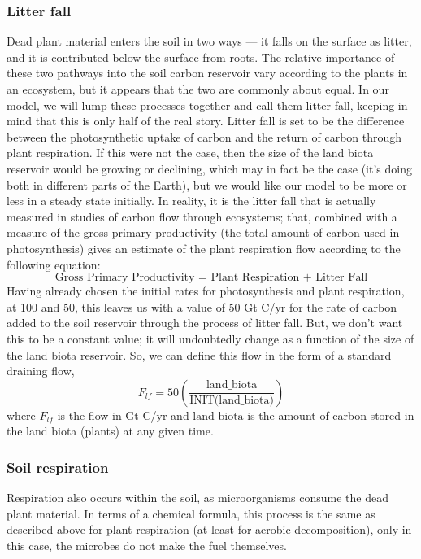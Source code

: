 \documentclass[11pt,letterpaper]{article}
\begin{document}
\subsubsection*{Litter fall}
Dead plant material enters the soil in two ways --- it falls on the surface as litter, and it is contributed below the surface from roots. The relative importance of these two pathways into the soil carbon reservoir vary according to the plants in an ecosystem, but it appears that the two are commonly about equal. In our model, we will lump these processes together and call them litter fall, keeping in mind that this is only half of the real story. Litter fall is set to be the difference between the photosynthetic uptake of carbon and the return of carbon through plant respiration. If this were not the case, then the size of the land biota reservoir would be growing or declining, which may in fact be the case (it's doing both in different parts of the Earth), but we would like our model to be more or less in a steady state initially. In reality, it is the litter fall that is actually measured in studies of carbon flow through ecosystems; that, combined with a measure of the gross primary productivity (the total amount of carbon used in photosynthesis) gives an estimate of the plant respiration flow according to the following equation:
$$\mbox{Gross Primary Productivity = Plant Respiration + Litter Fall}$$
Having already chosen the initial rates for photosynthesis and plant respiration, at 100 and 50, this leaves us with a value of 50 Gt C/yr for the rate of carbon added to the soil reservoir through the process of litter fall. But, we don't want this to be a constant value; it will undoubtedly change as a function of the size of the land biota reservoir. So, we can define this flow in the form of a standard draining flow,
\begin{equation}
F_{lf} = 50\left(\frac{\mbox{land\_biota}}{\mbox{INIT(land\_biota)}}\right) 
\end{equation}
where $F_{lf}$ is the flow in Gt C/yr and $\mbox{land\_biota}$ is the amount of carbon stored in the land biota (plants) at any given time.

\subsubsection*{Soil respiration}
Respiration also occurs within the soil, as microorganisms consume the dead plant material. In terms of a chemical formula, this process is the same as described above for plant respiration (at least for aerobic decomposition), only in this case, the microbes do not make the fuel themselves.
\end{document}
